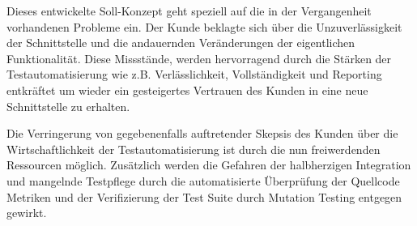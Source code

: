 Dieses entwickelte Soll-Konzept geht speziell auf die in der Vergangenheit vorhandenen Probleme ein. Der Kunde beklagte sich über die Unzuverlässigkeit der Schnittstelle und die andauernden Veränderungen der eigentlichen Funktionalität. Diese Missstände, werden hervorragend durch die Stärken der Testautomatisierung wie z.B. Verlässlichkeit, Vollständigkeit und Reporting entkräftet um wieder ein gesteigertes Vertrauen des Kunden in eine neue Schnittstelle zu erhalten. 

Die Verringerung von gegebenenfalls auftretender Skepsis des Kunden über die Wirtschaftlichkeit der Testautomatisierung ist durch die nun freiwerdenden Ressourcen möglich. Zusätzlich werden die Gefahren der halbherzigen Integration und mangelnde Testpflege durch die automatisierte Überprüfung der Quellcode Metriken und der Verifizierung der Test Suite durch Mutation Testing entgegen gewirkt.
